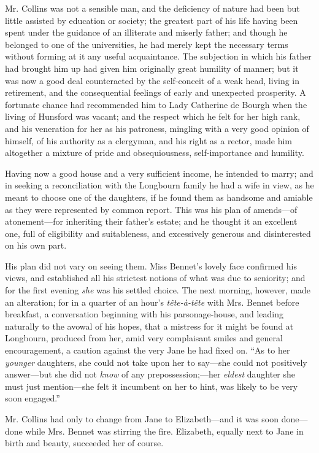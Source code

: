 Mr. Collins was not a sensible man, and the deficiency of nature had been but little assisted by education or society; the greatest part of his life having been spent under the guidance of an illiterate and miserly father; and though he belonged to one of the universities, he had merely kept the necessary terms without forming at it any useful acquaintance. The subjection in which his father had brought him up had given him originally great humility of manner; but it was now a good deal counteracted by the self-conceit of a weak head, living in retirement, and the consequential feelings of early and unexpected prosperity. A fortunate chance had recommended him to Lady Catherine de Bourgh when the living of Hunsford was vacant; and the respect which he felt for her high rank, and his veneration for her as his patroness, mingling with a very good opinion of himself, of his authority as a clergyman, and his right as a rector, made him altogether a mixture of pride and obsequiousness, self-importance and humility.

Having now a good house and a very sufficient income, he intended to marry; and in seeking a reconciliation with the Longbourn family he had a wife in view, as he meant to choose one of the daughters, if he found them as handsome and amiable as they were represented by common report. This was his plan of amends---of atonement---for inheriting their father's estate; and he thought it an excellent one, full of eligibility and suitableness, and excessively generous and disinterested on his own part.

His plan did not vary on seeing them. Miss Bennet's lovely face confirmed his views, and established all his strictest notions of what was due to seniority; and for the first evening \textit{she} was his settled choice. The next morning, however, made an alteration; for in a quarter of an hour's \textit{tête-à-tête} with Mrs. Bennet before breakfast, a conversation beginning with his parsonage-house, and leading naturally to the avowal of his hopes, that a mistress for it might be found at Longbourn, produced from her, amid very complaisant smiles and general encouragement, a caution against the very Jane he had fixed on. ``As to her \textit{younger} daughters, she could not take upon her to say---she could not positively answer---but she did not \textit{know} of any prepossession;---her \textit{eldest} daughter she must just mention---she felt it incumbent on her to hint, was likely to be very soon engaged.''

Mr. Collins had only to change from Jane to Elizabeth---and it was soon done---done while Mrs. Bennet was stirring the fire. Elizabeth, equally next to Jane in birth and beauty, succeeded her of course.

